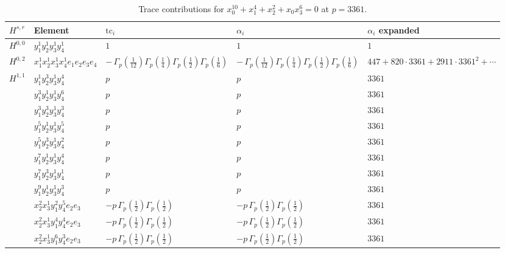 \documentclass[11pt]{article}
\begin{document}
\begin{table}[ht]
\centering
\caption{Trace contributions for $x_0^{10} + x_1^{4} + x_2^{2} + x_0 x_3^{6} = 0$ at $p=3361$.}\label{tab:deformed-54}
\renewcommand{\arraystretch}{1.1}
{\scriptsize
\begin{tabular}{@{}lllll@{}}
\toprule
$H^{s,r}$ & Element & $\mathrm{tc}_i$ & $\alpha_i$ & $\alpha_i$ expanded \\
\midrule
$H^{0,0}$ & $y_{1}^{1} y_{2}^{1} y_{3}^{1} y_{4}^{1}$ & $1$ & $1$ & $1$ \\
\midrule
$H^{0,2}$ & $x_{1}^{1} x_{2}^{1} x_{3}^{1} x_{4}^{1}  e_{1} e_{2} e_{3} e_{4}$ & $- \, \Gamma_p \left( \frac{1}{12} \right) \Gamma_p \left( \frac{1}{4} \right) \Gamma_p \left( \frac{1}{2} \right) \Gamma_p \left( \frac{1}{6} \right)$ & $- \, \Gamma_p \left( \frac{1}{12} \right) \Gamma_p \left( \frac{1}{4} \right) \Gamma_p \left( \frac{1}{2} \right) \Gamma_p \left( \frac{1}{6} \right)$ & $447{+}820{\cdot}3361{+}2911{\cdot}3361^{2}{+}\cdots$ \\
\midrule
$H^{1,1}$ & $y_{1}^{1} y_{2}^{3} y_{3}^{1} y_{4}^{4}$ & $p \,$ & $p \,$ & $3361$ \\
 & $y_{1}^{3} y_{2}^{1} y_{3}^{1} y_{4}^{6}$ & $p \,$ & $p \,$ & $3361$ \\
 & $y_{1}^{3} y_{2}^{3} y_{3}^{1} y_{4}^{3}$ & $p \,$ & $p \,$ & $3361$ \\
 & $y_{1}^{5} y_{2}^{1} y_{3}^{1} y_{4}^{5}$ & $p \,$ & $p \,$ & $3361$ \\
 & $y_{1}^{5} y_{2}^{3} y_{3}^{1} y_{4}^{2}$ & $p \,$ & $p \,$ & $3361$ \\
 & $y_{1}^{7} y_{2}^{1} y_{3}^{1} y_{4}^{4}$ & $p \,$ & $p \,$ & $3361$ \\
 & $y_{1}^{7} y_{2}^{3} y_{3}^{1} y_{4}^{1}$ & $p \,$ & $p \,$ & $3361$ \\
 & $y_{1}^{9} y_{2}^{1} y_{3}^{1} y_{4}^{3}$ & $p \,$ & $p \,$ & $3361$ \\
 & $x_{2}^{2} x_{3}^{1} y_{1}^{2} y_{4}^{5} e_{2} e_{3}$ & $- p \, \Gamma_p \left( \frac{1}{2} \right) \Gamma_p \left( \frac{1}{2} \right)$ & $- p \, \Gamma_p \left( \frac{1}{2} \right) \Gamma_p \left( \frac{1}{2} \right)$ & $3361$ \\
 & $x_{2}^{2} x_{3}^{1} y_{1}^{4} y_{4}^{4} e_{2} e_{3}$ & $- p \, \Gamma_p \left( \frac{1}{2} \right) \Gamma_p \left( \frac{1}{2} \right)$ & $- p \, \Gamma_p \left( \frac{1}{2} \right) \Gamma_p \left( \frac{1}{2} \right)$ & $3361$ \\
 & $x_{2}^{2} x_{3}^{1} y_{1}^{6} y_{4}^{3} e_{2} e_{3}$ & $- p \, \Gamma_p \left( \frac{1}{2} \right) \Gamma_p \left( \frac{1}{2} \right)$ & $- p \, \Gamma_p \left( \frac{1}{2} \right) \Gamma_p \left( \frac{1}{2} \right)$ & $3361$ \\

\end{tabular}}
\end{table}
\end{document}
